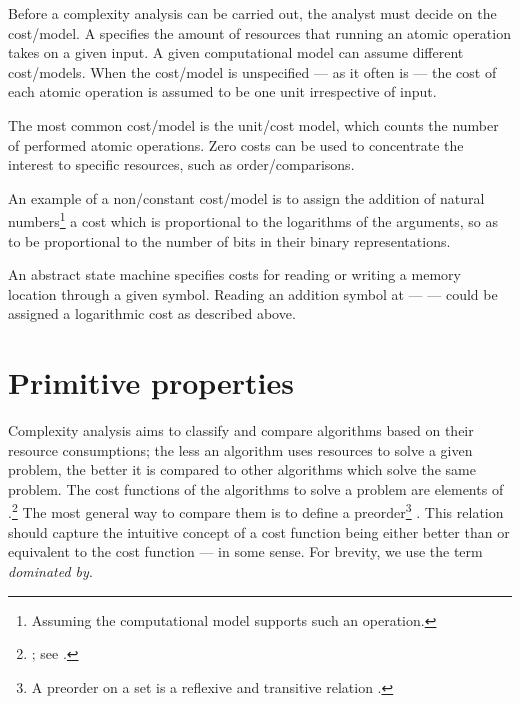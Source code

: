 \documentclass[b5paper, english, oneside]{memoir}
\begin{document}
Before a complexity analysis can be carried out, the analyst must decide on the cost\-/model. A  specifies the amount of resources that running an atomic operation takes on a given input. A given computational model can assume different cost\-/models. When the cost\-/model is unspecified --- as it often is --- the cost of each atomic operation is assumed to be one unit irrespective of input. 

\begin{example}
The most common cost\-/model is the unit\-/cost model, which counts the number of performed atomic operations. Zero costs can be used to concentrate the interest to specific resources, such as order\-/comparisons. 
\end{example}

\begin{example}
An example of a non\-/constant cost\-/model is to assign the addition of natural numbers\footnote{Assuming the computational model supports such an operation.} a cost which is proportional to the logarithms of the arguments, so as to be proportional to the number of bits in their binary representations. 
\end{example}

\begin{example}
An abstract state machine specifies costs for reading or writing a memory location through a given symbol. Reading an addition symbol  at  ---  --- could be assigned a logarithmic cost as described above.
\end{example}

\section{Primitive properties}

Complexity analysis aims to classify and compare algorithms based on their resource consumptions; the less an algorithm uses resources to solve a given problem, the better it is compared to other algorithms which solve the same problem. The cost functions of the algorithms to solve a problem  are elements of .\footnote{; see .} The most general way to compare them is to define a preorder\footnote{A preorder on a set  is a reflexive and transitive relation .} . This relation should capture the intuitive concept of a cost function  being either better than or equivalent to the cost function  --- in some sense. For brevity, we use the term \emph{dominated by}.
\end{document}
